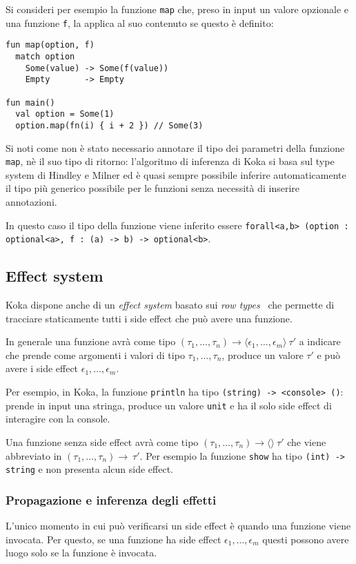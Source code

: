 Si consideri per esempio la funzione \lstinline{map} che, preso in input un valore opzionale e una funzione \lstinline{f}, la applica al suo contenuto se questo è definito:
\begin{lstlisting}[language=koka]
fun map(option, f)
  match option
    Some(value) -> Some(f(value))
    Empty       -> Empty

fun main()
  val option = Some(1)
  option.map(fn(i) { i + 2 }) // Some(3)
\end{lstlisting}

Si noti come non è stato necessario annotare il tipo dei parametri della funzione \lstinline{map}, nè il suo tipo di ritorno: l'algoritmo di inferenza di Koka si basa sul type system di Hindley e Milner ed è quasi sempre possibile inferire automaticamente il tipo più generico possibile per le funzioni senza necessità di inserire annotazioni.

In questo caso il tipo della funzione viene inferito essere \lstinline{forall<a,b> (option : optional<a>, f : (a) -> b) -> optional<b>}.

\subsection{Effect system}
Koka dispone anche di un \emph{effect system} basato sui \emph{row types}~\cite{cit:koka-programming-with-row-polymorphic-effect-types} che permette di tracciare staticamente tutti i side effect che può avere una funzione.

In generale una funzione avrà come tipo $(\tau_1, \dots, \tau_n) \rightarrow \langle\epsilon_1,\dots,\epsilon_m\rangle\ \tau'$ a indicare che prende come argomenti i valori di tipo $\tau_1, \dots, \tau_n$, produce un valore $\tau'$ e può avere i side effect $\epsilon_1,\dots,\epsilon_m$.

Per esempio, in Koka, la funzione \lstinline{println} ha tipo \lstinline{(string) -> <console> ()}: prende in input una stringa, produce un valore \lstinline{unit} e ha il solo side effect di interagire con la console.

Una funzione senza side effect avrà come tipo $(\tau_1, \dots, \tau_n) \rightarrow \langle\rangle\ \tau'$ che viene abbreviato in $(\tau_1, \dots, \tau_n) \rightarrow\ \tau'$. Per esempio la funzione \lstinline{show} ha tipo \lstinline{(int) -> string} e non presenta alcun side effect.

\subsubsection{Propagazione e inferenza degli effetti}
L'unico momento in cui può verificarsi un side effect è quando una funzione viene invocata. Per questo, se una funzione ha side effect $\epsilon_1,\dots,\epsilon_m$ questi possono avere luogo solo se la funzione è invocata.

